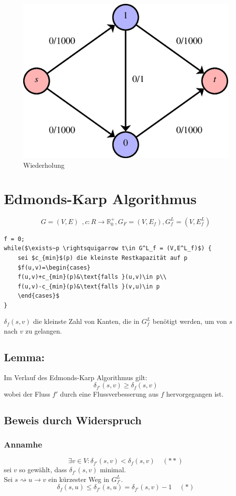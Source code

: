 \begin{figure}[h]
\centering
\includegraphics[width=0.4\linewidth]{26/Grafik/Diagramm1}
\caption{Wiederholung}
\label{fig:Diagramm1}
\end{figure}

\section{Edmonds-Karp Algorithmus}
\[ G=(V,E)~~,c:R\rightarrow\mathbb{R}^+_0,G_F=(V,E_f), G^L_f=(V,E^L_f) \]
\begin{lstlisting}[style = pseudo]
f = 0;
while($\exists~p \rightsquigarrow t\in G^L_f = (V,E^L_f)$) {
	sei $c_{min}$(p) die kleinste Restkapazität auf p
	$f(u,v)=\begin{cases}
	f(u,v)+c_{min}(p)&\text{falls }(u,v)\in p\\
	f(u,v)-c_{min}(p)&\text{falls }(v,u)\in p
	\end{cases}$
} 
\end{lstlisting}
$\delta_f(s,v)$ die kleinste Zahl von Kanten, die in $G^L_f$ benötigt werden, um von $s$ nach $v$ zu gelangen.
\subsection{Lemma:}
Im Verlauf des Edmonds-Karp Algorithmus gilt:
\[ \delta_{f'}(s,v) \geq \delta_f(s,v) \]
wobei der Fluss $f'$ durch eine Flussverbesserung aus $f$ hervorgegangen ist.
\subsection{Beweis durch Widerspruch}
\subsubsection{Annamhe}
\[ \exists v\in V:\delta_{f'}(s,v)<\delta_f(s,v) ~~~~~(**)\]
sei $v$ so gewählt, dass $\delta_{f'}(s,v)$ minimal.\\
Sei $s\rightsquigarrow u\rightarrow v$ ein kürzester Weg in $G^L_{f'}$.
\[ \delta_f(s,u)\leq\delta_{f'}(s,u) = \delta_{f'}(s,v)-1~~~~~(*) \]
